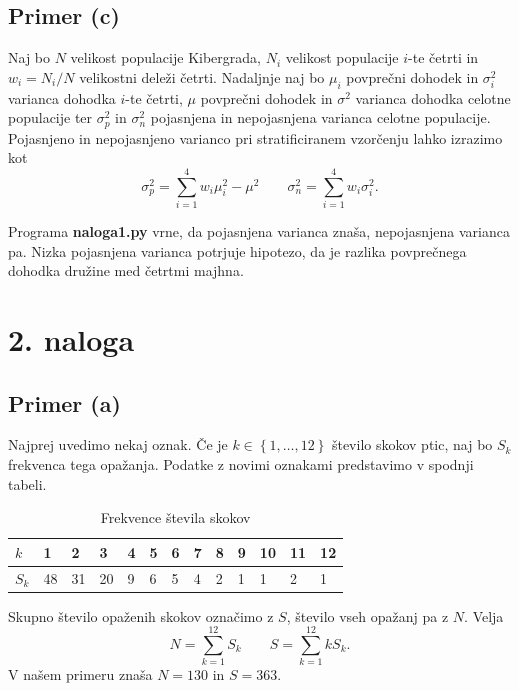 \documentclass[a4paper,11pt]{article}
\newcommand{\set}[1]{\left\{#1\right\}} %
\begin{document}
\subsection*{Primer (c)}

Naj bo $N$ velikost populacije Kibergrada, $N_i$ velikost populacije $i$-te četrti in $w_i = N_i/N$ velikostni deleži četrti.
Nadaljnje naj bo $\mu_i$ povprečni dohodek in $\sigma_i^2$ varianca dohodka $i$-te četrti,
$\mu$ povprečni dohodek in $\sigma^2$ varianca dohodka celotne populacije ter $\sigma^2_p$ in $\sigma^2_n$ pojasnjena in nepojasnjena varianca celotne populacije.
Pojasnjeno in nepojasnjeno varianco pri stratificiranem vzorčenju lahko izrazimo kot
\[\sigma^2_p = \sum_{i=1}^4 w_i \mu_i^2 - \mu^2 \qquad \sigma^2_n = \sum_{i=1}^4 w_i \sigma_i^2.\]

Programa \textbf{naloga1.py} vrne, da pojasnjena varianca znaša, nepojasnjena varianca pa.
Nizka pojasnjena varianca potrjuje hipotezo, da je razlika povprečnega dohodka družine med četrtmi majhna. 


\section*{2. naloga}

\subsection*{Primer (a)}

Najprej uvedimo nekaj oznak. 
Če je $k \in \set{1, \ldots, 12}$ število skokov ptic, naj bo $S_k$ frekvenca tega opažanja.
Podatke z novimi oznakami predstavimo v spodnji tabeli.
\begin{table}[H]
    \centering
    \begin{tabular}{|l|l|l|l|l|l|l|l|l|l|l|l|l|}
    \hline
    $k$ & 1 & 2 & 3 & 4 & 5 & 6 & 7 & 8 & 9 & 10 & 11 & 12 \\ \hline
    $S_k$ & 48 & 31 & 20 & 9 & 6 & 5 & 4 & 2 & 1 & 1 & 2 & 1 \\ \hline
    \end{tabular}
    \caption{Frekvence števila skokov}
    \label{freq}
\end{table}
Skupno število opaženih skokov označimo z $S$, število vseh opažanj pa z $N$.
Velja
\[N = \sum_{k=1}^{12} S_k \qquad S = \sum_{k=1}^{12} k S_k.\]
V našem primeru znaša $N = 130$ in $S = 363$.
\end{document}
